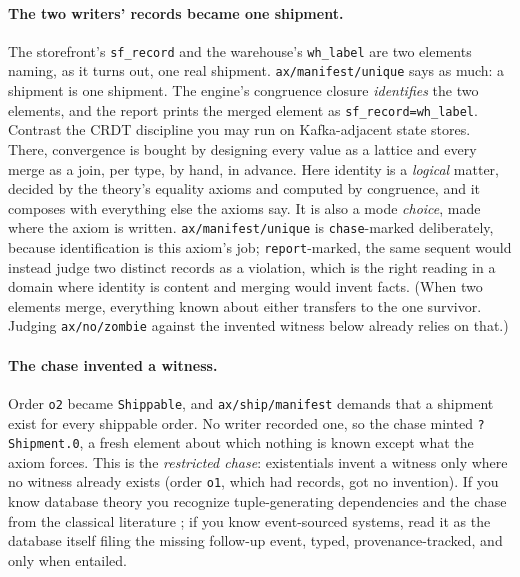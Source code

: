 \paragraph{The two writers' records became one shipment.}
The storefront's \texttt{sf\_record} and the warehouse's
\texttt{wh\_label} are two elements naming, as it turns out, one real
shipment. \texttt{ax/manifest/unique} says as much: a shipment is one
shipment. The engine's congruence closure \emph{identifies} the two
elements, and the report prints the merged element as
\texttt{sf\_record=wh\_label}. Contrast the CRDT discipline you may
run on Kafka-adjacent state stores. There, convergence is bought by
designing every value as a lattice and every merge as a join, per
type, by hand, in advance. Here identity is a \emph{logical} matter,
decided by the theory's equality axioms and computed by congruence,
and it composes with everything else the axioms say. It is also a mode
\emph{choice}, made where the axiom is written.
\texttt{ax/manifest/unique} is \texttt{chase}-marked
deliberately, because identification is this axiom's job;
\texttt{report}-marked, the same sequent would instead judge two
distinct records as a violation, which is the right reading in a
domain where identity is content and merging would invent facts. (When
two elements merge, everything known about either transfers to the one
survivor. Judging \texttt{ax/no/zombie} against the invented witness
below already relies on that.)

\paragraph{The chase invented a witness.}
Order \texttt{o2} became \texttt{Shippable}, and
\texttt{ax/ship/manifest} demands that a shipment exist for every
shippable order. No writer recorded one, so the chase minted
\texttt{?Shipment.0}, a fresh element about which nothing is known
except what the axiom forces. This is the \emph{restricted chase}:
existentials invent a witness only where no witness already exists
(order \texttt{o1}, which had records, got no invention). If you know
database theory you recognize tuple-generating dependencies and the
chase from the classical literature
\cite{fagin2005data,deutschnashremmel2008}; if you know event-sourced
systems, read it as the database itself filing the missing follow-up
event, typed, provenance-tracked, and only when entailed.

